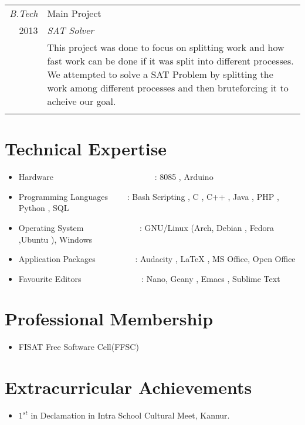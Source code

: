 \documentclass[a4paper]{article}
\begin{document}
\begin{tabular}{r|p{15cm}}
\emph{B.Tech} & Main Project \\
\textsc{2013} & \emph{SAT Solver} \\
& \normalsize{This project was done to focus on splitting work and how fast work can be done if it was split into different processes. We attempted to solve a SAT Problem by splitting the work among different processes and then bruteforcing it to acheive our goal. 
}
\\
\multicolumn{2}{c}{}
\end{tabular}

\section{Technical Expertise}
\begin{itemize}
\item Hardware \indent \ \ \ \ \ \  \  \ \ \ \ \ \ \ \ \ \ \ \ \ \ \ \ \ :  8085 , Arduino
\item Programming Languages \indent \ \ \ \ : Bash Scripting , C , C++ ,  Java ,  PHP , Python  , SQL
\item Operating System \indent \ \ \ \ \ \ \  \ \ \ \ \ \ : GNU/Linux (Arch, Debian , Fedora ,Ubuntu ), Windows 
\item Application Packages \indent \ \ \ \ \ \ \  \ \ : Audacity , LaTeX ,  MS Office, Open Office
\item Favourite Editors \indent \ \ \ \ \ \ \ \ \ \ \ \ \ \ :  Nano, Geany , Emacs , Sublime Text
\end{itemize}

\section{Professional Membership}
\begin{itemize}
\item FISAT Free Software Cell(FFSC)
\end{itemize}


\section{Extracurricular Achievements}
\begin{itemize}
\item $ 1^{st} $ in Declamation in Intra School Cultural Meet, Kannur.
\end{itemize}
\end{document}
